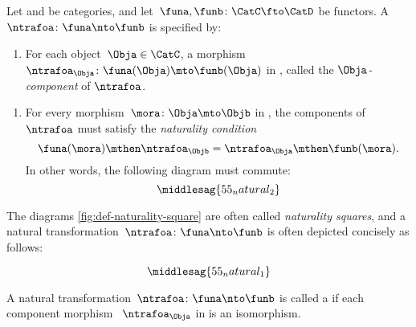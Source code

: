 \begin{ctdefinition}
    \label{def:natural-transformation}
    Let \CatC and \CatD be categories, and let~$\funa,\funb\colon \CatC\fto \CatD$ be functors.
    A \emph{}~$\ntrafoa \colon \funa\nto \funb$ is specified by:

    \constit
    \begin{enumerate}
        \item For each object~$\Obja\in \CatC$, a morphism $\ntrafoa_\Obja \colon \funa(\Obja)\mto \funb(\Obja)$ in \CatD, called the $\Obja$\emph{-component} of $\ntrafoa$.
    \end{enumerate}
    \condit
    \begin{enumerate}
        \item For every morphism~$\mora\colon \Obja\mto \Objb$ in \CatC, the components of $\ntrafoa$ must satisfy the \emph{naturality condition}
              \begin{equation}
                  \funa(\mora)\mthen \ntrafoa_\Objb = \ntrafoa_\Obja\mthen \funb(\mora).
              \end{equation}
              In other words, the following diagram must commute:
              \begin{equation}\label{fig:def-naturality-square}
                  \middlesag{55_natural_2}
              \end{equation}
    \end{enumerate}
\end{ctdefinition}

The diagrams \cref{fig:def-naturality-square} are often called \emph{naturality squares}, and a natural transformation~$\ntrafoa \colon \funa\nto \funb$ is often depicted concisely as follows:

\begin{equation}
    \middlesag{55_natural_1}
\end{equation}
\begin{figure}[h!]
    \centering
    \begin{ctdefinitionshade}
    \end{ctdefinitionshade}
    \caption{}
    \label{fig:nat_trans_graphically}
\end{figure}


\begin{ctdefinition}
    \label{def:nat_iso}
    A natural transformation~$\ntrafoa \colon \funa \nto \funb $ is called a \emph{} if each component morphism ~$\ntrafoa_\Obja$ in \CatD is an isomorphism.
\end{ctdefinition}
\clearpage

